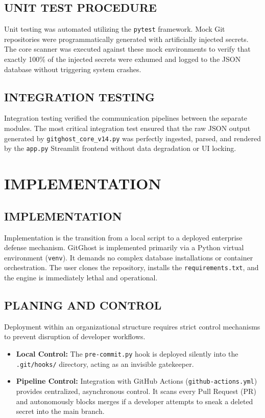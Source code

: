 \documentclass[12pt, a4paper, oneside]{report}
\begin{document}
\section{UNIT TEST PROCEDURE}
Unit testing was automated utilizing the \texttt{pytest} framework. Mock Git repositories were programmatically generated with artificially injected secrets. The core scanner was executed against these mock environments to verify that exactly 100\% of the injected secrets were exhumed and logged to the JSON database without triggering system crashes.

\section{INTEGRATION TESTING}
Integration testing verified the communication pipelines between the separate modules. The most critical integration test ensured that the raw JSON output generated by \texttt{gitghost\_core\_v14.py} was perfectly ingested, parsed, and rendered by the \texttt{app.py} Streamlit frontend without data degradation or UI locking.

\chapter{IMPLEMENTATION}

\section{IMPLEMENTATION}
Implementation is the transition from a local script to a deployed enterprise defense mechanism. GitGhost is implemented primarily via a Python virtual environment (\texttt{venv}). It demands no complex database installations or container orchestration. The user clones the repository, installs the \texttt{requirements.txt}, and the engine is immediately lethal and operational.

\section{PLANING AND CONTROL}
Deployment within an organizational structure requires strict control mechanisms to prevent disruption of developer workflows. 
\begin{itemize}
    \item \textbf{Local Control:} The \texttt{pre-commit.py} hook is deployed silently into the \texttt{.git/hooks/} directory, acting as an invisible gatekeeper.
    \item \textbf{Pipeline Control:} Integration with GitHub Actions (\texttt{github-actions.yml}) provides centralized, asynchronous control. It scans every Pull Request (PR) and autonomously blocks merges if a developer attempts to sneak a deleted secret into the main branch.
\end{itemize}
\end{document}
